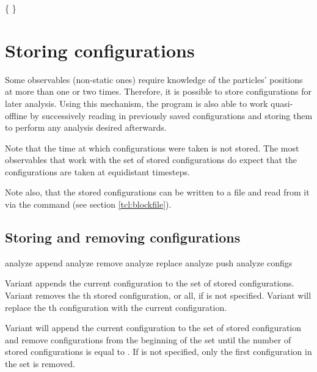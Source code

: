 \begin{code}
  \{    \}
\end{code}

\section{Storing configurations}
\label{sec:stored-configs}

Some observables (\ie non-static ones) require knowledge of the
particles' positions at more than one or two times. Therefore, it is
possible to store configurations for later analysis.  Using this
mechanism, the program is also able to work quasi-offline by
successively reading in previously saved configurations and storing
them to perform any analysis desired afterwards.

Note that the time at which configurations were taken is not
stored.  The most observables that work with the set of stored
configurations do expect that the configurations are taken at
equidistant timesteps.

Note also, that the stored configurations can be written to a file and
read from it via the  command (see section
\vref{tcl:blockfile}).

\subsection{Storing and removing configurations}
\label{analyze:append}
\label{analyze:push}
\label{analyze:replace}
\label{analyze:remove}

\begin{essyntax}
   analyze append
   analyze remove 
   analyze replace  
   analyze push 
   analyze configs 
\end{essyntax}

Variant  appends the current configuration to the set of
stored configurations.  Variant  removes the th
stored configuration, or all, if  is not specified.  Variant
 will replace the th configuration with the
current configuration.

Variant  will append the current configuration to the set
of stored configuration and remove configurations from the beginning
of the set until the number of stored configurations is equal to
. If  is not specified, only the first
configuration in the set is removed.

